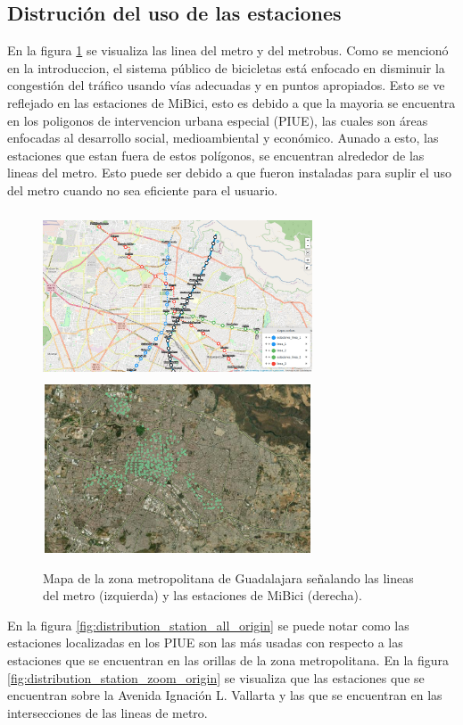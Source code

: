 \subsection{Distrución del uso de las estaciones}

En la figura \ref{fig:map_metro_stations} se visualiza las linea del metro y del metrobus. Como se mencionó en la introduccion, el sistema público de bicicletas está enfocado en disminuir la congestión del tráfico usando vías adecuadas y en puntos apropiados. Esto se ve reflejado en las estaciones de MiBici, esto es debido a que la mayoria se encuentra en los poligonos de intervencion urbana especial (PIUE), las cuales son áreas enfocadas al desarrollo social, medioambiental y económico\cite{poligono_2018}. Aunado a esto, las estaciones que estan fuera de estos polígonos, se encuentran alrededor de las lineas del metro. Esto puede ser debido a que fueron instaladas para suplir el uso del metro cuando no sea eficiente para el usuario.

\begin{figure}[H]
    \centering
    \includegraphics[width=8cm,height=5cm]{Graphics/map_with_metro_lines.png}
    \includegraphics[width=8cm,height=5cm]{Graphics/stations.png}
    \caption{Mapa de la zona metropolitana de Guadalajara señalando las lineas del metro (izquierda) y las estaciones de MiBici (derecha).}
    \label{fig:map_metro_stations}
\end{figure}

En la figura \ref{fig:distribution_station_all_origin} se puede notar como las estaciones localizadas en los PIUE son las más usadas con respecto a las estaciones que se encuentran en las orillas de la zona metropolitana. En la figura \ref{fig:distribution_station_zoom_origin} se visualiza que las estaciones que se encuentran sobre la Avenida Ignación L. Vallarta y las que se encuentran en las intersecciones de las lineas de metro.

